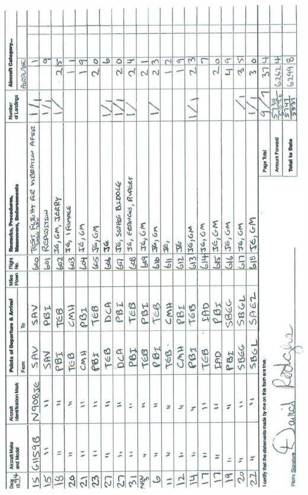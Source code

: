 \documentclass[10pt]{article}
\begin{document}
\includegraphics[max width=\textwidth, center]{2025_02_27_dd68c3d38de88f0516d9g-035}\\
\end{document}
